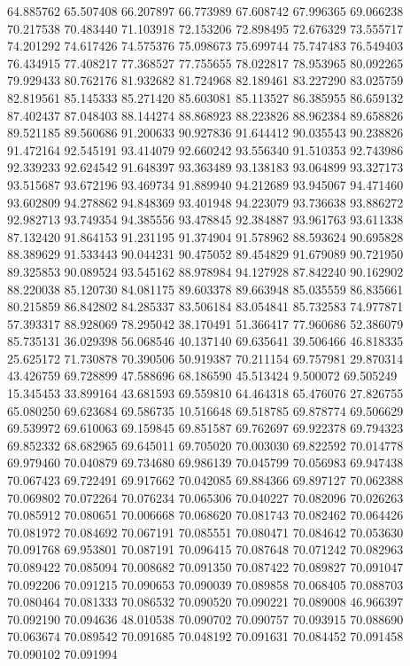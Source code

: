 64.885762
65.507408
66.207897
66.773989
67.608742
67.996365
69.066238
70.217538
70.483440
71.103918
72.153206
72.898495
72.676329
73.555717
74.201292
74.617426
74.575376
75.098673
75.699744
75.747483
76.549403
76.434915
77.408217
77.368527
77.755655
78.022817
78.953965
80.092265
79.929433
80.762176
81.932682
81.724968
82.189461
83.227290
83.025759
82.819561
85.145333
85.271420
85.603081
85.113527
86.385955
86.659132
87.402437
87.048403
88.144274
88.868923
88.223826
88.962384
89.658826
89.521185
89.560686
91.200633
90.927836
91.644412
90.035543
90.238826
91.472164
92.545191
93.414079
92.660242
93.556340
91.510353
92.743986
92.339233
92.624542
91.648397
93.363489
93.138183
93.064899
93.327173
93.515687
93.672196
93.469734
91.889940
94.212689
93.945067
94.471460
93.602809
94.278862
94.848369
93.401948
94.223079
93.736638
93.886272
92.982713
93.749354
94.385556
93.478845
92.384887
93.961763
93.611338
87.132420
91.864153
91.231195
91.374904
91.578962
88.593624
90.695828
88.389629
91.533443
90.044231
90.475052
89.454829
91.679089
90.721950
89.325853
90.089524
93.545162
88.978984
94.127928
87.842240
90.162902
88.220038
85.120730
84.081175
89.603378
89.663948
85.035559
86.835661
80.215859
86.842802
84.285337
83.506184
83.054841
85.732583
74.977871
57.393317
88.928069
78.295042
38.170491
51.366417
77.960686
52.386079
85.735131
36.029398
56.068546
40.137140
69.635641
39.506466
46.818335
25.625172
71.730878
70.390506
50.919387
70.211154
69.757981
29.870314
43.426759
69.728899
47.588696
68.186590
45.513424
9.500072
69.505249
15.345453
33.899164
43.681593
69.559810
64.464318
65.476076
27.826755
65.080250
69.623684
69.586735
10.516648
69.518785
69.878774
69.506629
69.539972
69.610063
69.159845
69.851587
69.762697
69.922378
69.794323
69.852332
68.682965
69.645011
69.705020
70.003030
69.822592
70.014778
69.979460
70.040879
69.734680
69.986139
70.045799
70.056983
69.947438
70.067423
69.722491
69.917662
70.042085
69.884366
69.897127
70.062388
70.069802
70.072264
70.076234
70.065306
70.040227
70.082096
70.026263
70.085912
70.080651
70.006668
70.068620
70.081743
70.082462
70.064426
70.081972
70.084692
70.067191
70.085551
70.080471
70.084642
70.053630
70.091768
69.953801
70.087191
70.096415
70.087648
70.071242
70.082963
70.089422
70.085094
70.008682
70.091350
70.087422
70.089827
70.091047
70.092206
70.091215
70.090653
70.090039
70.089858
70.068405
70.088703
70.080464
70.081333
70.086532
70.090520
70.090221
70.089008
46.966397
70.092190
70.094636
48.010538
70.090702
70.090757
70.093915
70.088690
70.063674
70.089542
70.091685
70.048192
70.091631
70.084452
70.091458
70.090102
70.091994
